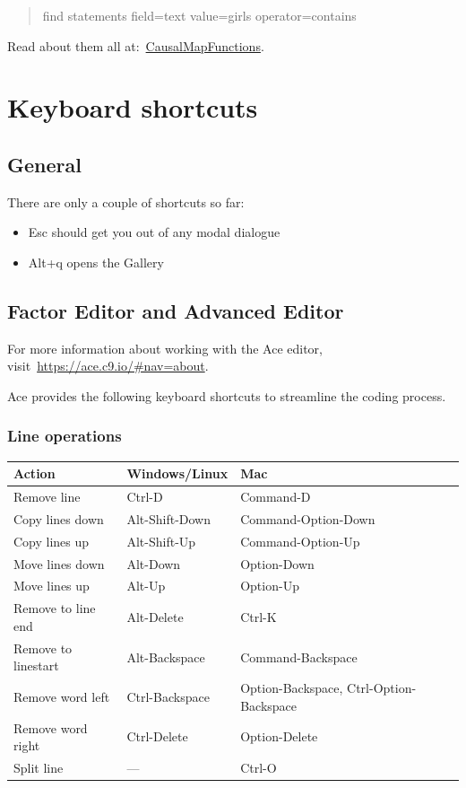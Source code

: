 \documentclass[
]{book}
\providecommand{\tightlist}{%
  \setlength{\itemsep}{0pt}\setlength{\parskip}{0pt}}
\begin{document}
\begin{quote}
find statements field=text value=girls operator=contains
\end{quote}

Read about them all at:~\href{https://stevepowell99.github.io/CausalMapFunctions/reference/index.html}{CausalMapFunctions}.

\hypertarget{xkeyboard}{%
\chapter{Keyboard shortcuts}\label{xkeyboard}}

\hypertarget{general}{%
\section{General}\label{general}}

There are only a couple of shortcuts so far:

\begin{itemize}
\tightlist
\item
  Esc should get you out of any modal dialogue
\item
  Alt+q opens the Gallery
\end{itemize}

\hypertarget{factor-editor-and-advanced-editor}{%
\section{Factor Editor and Advanced Editor}\label{factor-editor-and-advanced-editor}}

For more information about working with the Ace editor, visit~\url{https://ace.c9.io/\#nav=about}.

Ace provides the following keyboard shortcuts to streamline the coding process.

\hypertarget{line-operations}{%
\subsection{Line operations}\label{line-operations}}

\begin{longtable}[]{@{}lll@{}}
\toprule
Action & Windows/Linux & Mac \\
\midrule
\endhead
Remove line & Ctrl-D & Command-D \\
Copy lines down & Alt-Shift-Down & Command-Option-Down \\
Copy lines up & Alt-Shift-Up & Command-Option-Up \\
Move lines down & Alt-Down & Option-Down \\
Move lines up & Alt-Up & Option-Up \\
Remove to line end & Alt-Delete & Ctrl-K \\
Remove to linestart & Alt-Backspace & Command-Backspace \\
Remove word left & Ctrl-Backspace & Option-Backspace, Ctrl-Option-Backspace \\
Remove word right & Ctrl-Delete & Option-Delete \\
Split line & --- & Ctrl-O \\
\bottomrule
\end{longtable}
\end{document}
